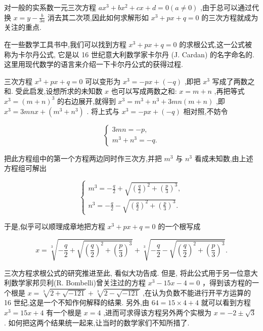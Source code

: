 \documentclass[10pt]{article}
\begin{document}
对一般的实系数一元三次方程 \(a{x}^{3} + b{x}^{2} + {cx} + d = 0\left( {a \neq  0}\right)\) ,由于总可以通过代换 \(x = y - \frac{b}{3a}\) 消去其二次项,因此如何求解形如 \({x}^{3} + {px} + q = 0\) 的三次方程就成为关注的重点.

在一些数学工具书中,我们可以找到方程 \({x}^{3} + {px} + q = 0\) 的求根公式,这一公式被称为卡尔丹公式, 它是以 16 世纪意大利数学家卡尔丹 (J. Cardan) 的名字命名的. 这里用现代数学的语言来介绍一下卡尔丹公式的获得过程.

三次方程 \({x}^{3} + {px} + q = 0\) 可以变形为 \({x}^{3} =  - {px} + \left( {-q}\right)\) ,即把 \({x}^{3}\) 写成了两数之和. 受此启发,设想所求的未知数 \(x\) 也可以写成两数之和: \(x = m + n\) ,再把等式 \({x}^{3} = {\left( m + n\right) }^{3}\) 的右边展开,就得到 \({x}^{3} = {m}^{3} + {n}^{3} + {3mn}\left( {m + n}\right)\) ,即 \({x}^{3} = {3mnx} + \left( {{m}^{3} + {n}^{3}}\right)\) . 将上式与 \({x}^{3} =  - {px} + \left( {-q}\right)\) 相对照,不妨令

\[
\left\{  \begin{array}{l} {3mn} =  - p, \\  {m}^{3} + {n}^{3} =  - q. \end{array}\right.
\]

把此方程组中的第一个方程两边同时作三次方,并把 \({m}^{3}\) 与 \({n}^{3}\) 看成未知数,由上述方程组可解出

\[
\left\{  \begin{array}{l} {m}^{3} =  - \frac{q}{2} + \sqrt{{\left( \frac{q}{2}\right) }^{2} + {\left( \frac{p}{3}\right) }^{3}}, \\  {n}^{3} =  - \frac{q}{2} - \sqrt{{\left( \frac{q}{2}\right) }^{2} + {\left( \frac{p}{3}\right) }^{3}}. \end{array}\right.
\]

于是,似乎可以顺理成章地把方程 \({x}^{3} + {px} + q = 0\) 的一个根写成

\[
x = \sqrt[3]{-\frac{q}{2} + \sqrt{{\left( \frac{q}{2}\right) }^{2} + {\left( \frac{p}{3}\right) }^{3}}} + \sqrt[3]{-\frac{q}{2} - \sqrt{{\left( \frac{q}{2}\right) }^{2} + {\left( \frac{p}{3}\right) }^{3}}}.
\]

三次方程求根公式的研究推进至此, 看似大功告成. 但是, 将此公式用于另一位意大利数学家邦贝利(R. Bombelli)曾关注过的方程 \({x}^{3} - {15x} - 4 = 0\) ，得到该方程的一个根是 \(x = \sqrt[3]{2 + \sqrt{-{121}}} + \sqrt[3]{2 - \sqrt{-{121}}}\) ,在认为负数不能进行开平方运算的 16 世纪,这是一个不知作何解释的结果. 另外,由 \({64} = {15} \times  4 + 4\) 就可以看到方程 \({x}^{3} = {15x} + 4\) 有一个根是 \(x = 4\) ,进而可求得该方程另外两个实根为 \(x =  - 2 \pm  \sqrt{3}\) . 如何把这两个结果统一起来,让当时的数学家们不知所措了.
\end{document}
